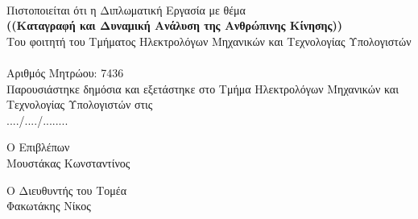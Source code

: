 \thispagestyle{empty}
\newpage

\thispagestyle{empty}
\clearpage\mbox{}\clearpage

\begin{center}
    {}\\[1cm]
    Πιστοποιείται ότι η Διπλωματική Εργασία με θέμα\\[0.5cm]
    \textbf{((Καταγραφή και Δυναμική Ανάλυση της Ανθρώπινης Κίνησης))}\\[1cm]
    Του φοιτητή του Τμήματος Ηλεκτρολόγων Μηχανικών και Τεχνολογίας Υπολογιστών\\[0.5cm]
    \\[10pt]
    Αριθμός Μητρώου: 7436\\[2cm]
    Παρουσιάστηκε δημόσια και εξετάστηκε στο Τμήμα Ηλεκτρολόγων Μηχανικών και Τεχνολογίας Υπολογιστών στις\\
    ..../..../........\\
\end{center}

\vfill

\begin{minipage}[t]{0.5\textwidth}
    \begin{flushleft}
        Ο Επιβλέπων\\
        Μουστάκας Κωνσταντίνος
    \end{flushleft}
\end{minipage}%
\begin{minipage}[t]{0.5\textwidth}
    \begin{flushright}
        Ο Διευθυντής του Τομέα\\
        Φακωτάκης Νίκος
    \end{flushright}
\end{minipage}%

\thispagestyle{empty}
\newpage
\clearpage\mbox{}
\thispagestyle{empty}
\clearpage
